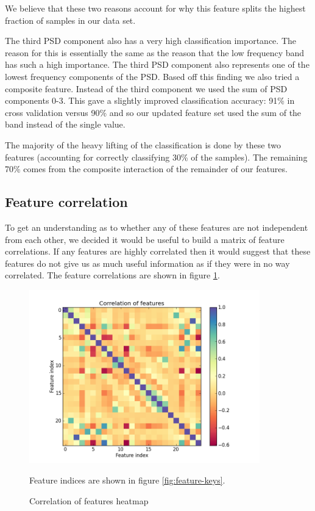 \documentclass[ %
                    author={Sam Phippen},
                supervisor={Dr. Rafal Bogacz},
                     title={Real time voice activity detectors in noisy personal computing environments},
                  subtitle={},
                    degree={MEng},
                      year={2012} ]{thesis}
\begin{document}
We believe that these two reasons account for why this feature splits the
highest fraction of samples in our data set.

The third PSD component also has a very high classification importance. The
reason for this is essentially the same as the reason that the low frequency
band has such a high importance. The third PSD component also represents one of
the lowest frequency components of the PSD. Based off this finding we also
tried a composite feature. Instead of the third component we used the sum of
PSD components 0-3. This gave a slightly improved classification accuracy: 91\%
in cross validation versus 90\% and so our updated feature set used the sum of
the band instead of the single value.

The majority of the heavy lifting of the classification is done by these two
features (accounting for correctly classifying 30\% of the samples). The
remaining 70\% comes from the composite interaction of the remainder of our
features.

\subsection{Feature correlation}

To get an understanding as to whether any of these features are not
independent from each other, we decided it would be useful to build a matrix of
feature correlations. If any features are highly correlated then it would
suggest that these features do not give us as much useful information as if
they were in no way correlated. The feature correlations are shown in
figure \ref{fig:correlation-awesome}.


\begin{figure}
    \begin{center}
        \includegraphics[width=10cm]{correlation_awesome.png}
    \end{center}
    Feature indices are shown in figure \ref{fig:feature-keys}.

    \caption{Correlation of features heatmap}
    \label{fig:correlation-awesome}
\end{figure}
\end{document}
